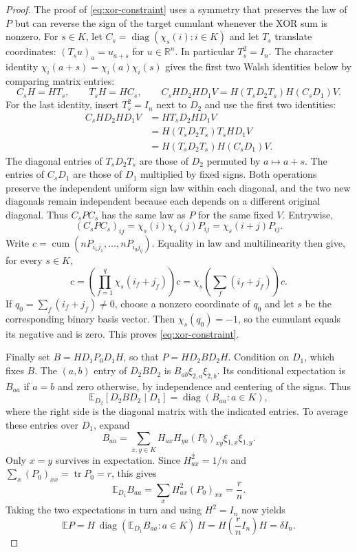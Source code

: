 \documentclass[11pt]{article}
\theoremstyle{definition}
\theoremstyle{remark}
\theoremstyle{plain}
\newcommand{\E}{\mathbb E}
\newcommand{\R}{\mathbb R}
\DeclareMathOperator{\tr}{tr}
\DeclareMathOperator{\diag}{diag}
\DeclareMathOperator{\cum}{cum}
\begin{document}
\begin{proof}
The proof of \eqref{eq:xor-constraint} uses a symmetry that preserves the
law of $P$ but can reverse the sign of the target cumulant whenever
the XOR sum is nonzero. For $s\in K$, let
\(C_s=\diag(\chi_s(i):i\in K)\) and let $T_s$ translate coordinates:
$(T_su)_a=u_{a+s}$ for $u\in\R^n$. In particular $T_s^2=I_n$.
The character identity
$\chi_i(a+s)=\chi_i(a)\chi_i(s)$ gives the first two Walsh identities
below by comparing matrix entries:
\begin{equation}\label{eq:walsh-conjugation}
 C_sH=HT_s,\qquad T_sH=HC_s,\qquad
 C_sHD_2HD_1V=H(T_sD_2T_s)H(C_sD_1)V.
\end{equation}
For the last identity, insert $T_s^2=I_n$ next to $D_2$ and use
the first two identities:
\[
 \begin{aligned}
 C_sHD_2HD_1V
 &=HT_sD_2HD_1V\\
 &=H(T_sD_2T_s)T_sHD_1V\\
 &=H(T_sD_2T_s)H(C_sD_1)V.
 \end{aligned}
\]
The diagonal entries of $T_sD_2T_s$ are those of $D_2$ permuted
by $a\mapsto a+s$. The entries of $C_sD_1$ are those of $D_1$
multiplied by fixed signs. Both operations preserve the independent
uniform sign law within each diagonal, and the two new diagonals
remain independent because each depends on a different original
diagonal. Thus
\(C_sPC_s\) has the same law as \(P\) for the same fixed \(V\).
Entrywise,
\[
 (C_sPC_s)_{ij}=\chi_s(i)\chi_s(j)P_{ij}
              =\chi_s(i+j)P_{ij}.
\]
Write $c=\cum(nP_{i_1j_1},\ldots,nP_{i_qj_q})$. Equality in law
and multilinearity then give, for every $s\in K$,
\[
 c=\left(\prod_{f=1}^q\chi_s(i_f+j_f)\right)c
   =\chi_s\!\left(\sum_f(i_f+j_f)\right)c.
\]
If
$q_0=\sum_f(i_f+j_f)\ne0$, choose a nonzero coordinate of $q_0$
and let $s$ be the corresponding binary basis vector. Then
$\chi_s(q_0)=-1$, so the cumulant equals its negative and is zero.
This proves \eqref{eq:xor-constraint}.

Finally set \(B=HD_1P_0D_1H\), so that $P=HD_2BD_2H$.
Condition on $D_1$, which fixes $B$. The $(a,b)$ entry of $D_2BD_2$
is $B_{ab}\xi_{2,a}\xi_{2,b}$. Its conditional expectation is
$B_{aa}$ if $a=b$ and zero otherwise, by independence and centering
of the signs. Thus
\[
 \E_{D_2}[D_2BD_2\mid D_1]
      =\diag(B_{aa}:a\in K),
\]
where the right side is the diagonal matrix with the indicated
entries. To average these entries over $D_1$, expand
\[
 B_{aa}=\sum_{x,y\in K}
        H_{ax}H_{ya}(P_0)_{xy}\xi_{1,x}\xi_{1,y}.
\]
Only $x=y$ survives in expectation. Since $H_{ax}^2=1/n$ and
$\sum_x(P_0)_{xx}=\tr P_0=r$, this gives
\[
 \E_{D_1}B_{aa}
     =\sum_x H_{ax}^2(P_0)_{xx}=\frac rn.
\]
Taking the two expectations in turn and using $H^2=I_n$ now yields
\[
 \E P
 =H\,\diag(\E_{D_1}B_{aa}:a\in K)\,H
 =H\left(\frac rn I_n\right)H
 =\delta I_n.
\]
\end{proof}
\end{document}
